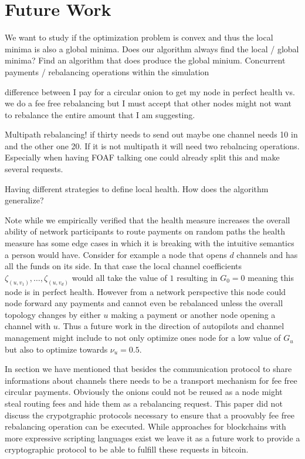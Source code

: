 \documentclass[a4paper]{paper}
\begin{document}


\section{Future Work}
We want to study if the optimization problem is convex and thus the local minima is also a global minima.
Does our algorithm always find the local / global minima?
Find an algorithm that does produce the global minium.
Concurrent payments / rebalancing operations within the simulation

difference between I pay for a circular onion to get my node in perfect health vs. we do a fee free rebalancing but I must accept that other nodes might not want to rebalance the entire amount that I am suggesting.

Multipath rebalancing! if thirty needs to send out maybe one channel needs 10 in and the other one 20. If it is not multipath it will need two rebalncing operations. Especially when having FOAF talking one could already split this and make several requests.

Having different strategies to define local health. How does the algorithm generalize? 

Note while we empirically verified that the health measure increases the overall ability of network participants to route payments on random paths the health measure has some edge cases in which it is breaking with the intuitive semantics a person would have.
Consider for example a node that opens $d$ channels and has all the funds on its side.
In that case the local channel coefficients $\zeta_{(u,v_1)},\dots,\zeta_{(u,v_d)}$ would all take the value of $1$ resulting in $G_0 = 0$ meaning this node is in perfect health.
However from a network perspective this node could node forward any payments and cannot even be rebalanced unless the overall topology changes by either $u$ making a payment or another node opening a channel with $u$.
Thus a future work in the direction of autopilots and channel management might include to not only optimize ones node for a low value of $G_u$ but also to optimize towards $\nu_u = 0.5$.

In section we have mentioned that besides the communication protocol to share informations about channels there needs to be a transport mechanism for fee free circular payments.
Obviously the onions could not be reused as a node might steal routing fees and hide them as a rebalancing request.
This paper did not discuss the crypotgraphic protocols necessary to ensure that a proovably fee free rebalancing operation can be executed.
While approaches for blockchains with more expressive scripting languages exist \cite{khalil2017revive} we leave it as a future work to provide a cryptographic protocol to be able to fulfill these requests in bitcoin.
\end{document}
